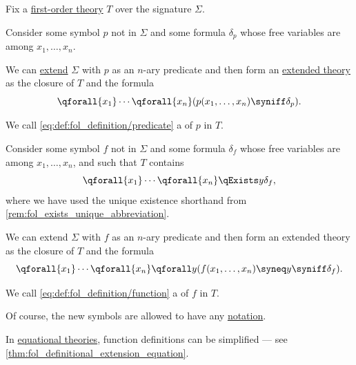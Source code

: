 \begin{definition}\label{def:fol_definition}
  Fix a \hyperref[def:fol_theory]{first-order theory} \( T \) over the signature \( \Sigma \).

  \begin{thmenum}
     Consider some symbol \( p \) not in \( \Sigma \) and some formula \( \delta_p \) whose free variables are among \( x_1, \ldots, x_n \).

    We can \hyperref[def:fol_signature_extension]{extend} \( \Sigma \) with \( p \) as an \( n \)-ary predicate and then form an \hyperref[def:fol_theory/extension]{extended theory} as the closure of \( T \) and the formula
    \begin{equation}\label{eq:def:fol_definition/predicate}
      \qforall {x_1} \cdots \qforall {x_n} (p(x_1, \ldots, x_n) \syniff \delta_p).
    \end{equation}

    We call \eqref{eq:def:fol_definition/predicate} a  of \( p \) in \( T \).

     Consider some symbol \( f \) not in \( \Sigma \) and some formula \( \delta_f \) whose free variables are among \( x_1, \ldots, x_n \), and such that \( T \) contains
    \begin{equation}\label{eq:def:fol_definition/function/condition}
      \qforall {x_1} \cdots \qforall {x_n} \qExists y \delta_f,
    \end{equation}
    where we have used the unique existence shorthand from \cref{rem:fol_exists_unique_abbreviation}.

    We can extend \( \Sigma \) with \( f \) as an \( n \)-ary predicate and then form an extended theory as the closure of \( T \) and the formula
    \begin{equation}\label{eq:def:fol_definition/function}
      \qforall {x_1} \cdots \qforall {x_n} \qforall y (f(x_1, \ldots, x_n) \syneq y \syniff \delta_f).
    \end{equation}

    We call \eqref{eq:def:fol_definition/function} a  of \( f \) in \( T \).
  \end{thmenum}
\end{definition}
\begin{comments}
  \item Of course, the new symbols are allowed to have any \hyperref[def:fol_signature/notation]{notation}.
  \item In \hyperref[def:fol_equational_theory]{equational theories}, function definitions can be simplified --- see \cref{thm:fol_definitional_extension_equation}.
\end{comments}

